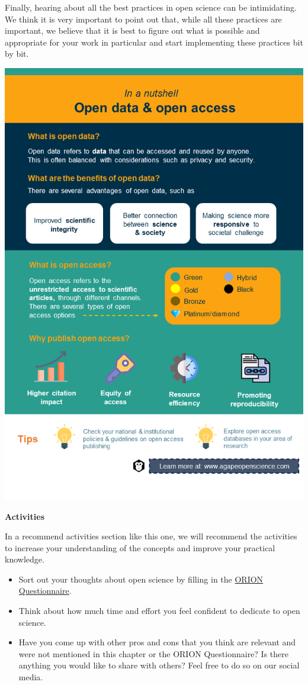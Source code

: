 \documentclass[
]{book}
\begin{document}
Finally, hearing about all the best practices in open science can be intimidating. We think it is very important to point out that, while all these practices are important, we believe that it is best to figure out what is possible and appropriate for your work in particular and start implementing these practices bit by bit.

\includegraphics{images/slide2.png}

\textbf{Activities}

In a recommend activities section like this one, we will recommend the activities to increase your understanding of the concepts and improve your practical knowledge.

\begin{itemize}
\item
  Sort out your thoughts about open science by filling in the \href{https://www.orion-openscience.eu/public/2019-01/ORION_Questionaire_RPFO-CRECIM.pdf}{ORION Questionnaire}.
\item
  Think about how much time and effort you feel confident to dedicate to open science.
\item
  Have you come up with other pros and cons that you think are relevant and were not mentioned in this chapter or the ORION Questionnaire? Is there anything you would like to share with others? Feel free to do so on our social media.
\end{itemize}
\end{document}
